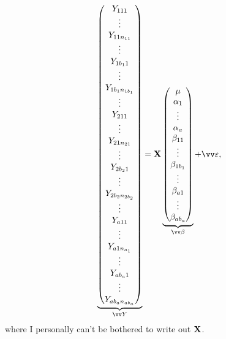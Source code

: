 \[ \underbrace{\begin{pmatrix}
            Y_{1 1 1}          \\
            \vdots             \\
            Y_{1 1 n_{11}}     \\
            \vdots             \\
            Y_{1 b_1 1}        \\
            \vdots             \\
            Y_{1 b_1 n_{1b_1}} \\
            \vdots             \\
            Y_{2 1 1}          \\
            \vdots             \\
            Y_{2 1 n_{21}}     \\
            \vdots             \\
            Y_{2 b_2 1}        \\
            \vdots             \\
            Y_{2 b_2 n_{2b_2}} \\
            \vdots             \\
            Y_{a 1 1}          \\
            \vdots             \\
            Y_{a 1 n_{a_1}}    \\
            \vdots             \\
            Y_{a b_a 1}        \\
            \vdots             \\
            Y_{a b_a n_{ab_a}}
        \end{pmatrix}}_{\Vector{Y}}=\Matrix{X}\underbrace{\begin{pmatrix}
            \mu          \\
            \alpha_1     \\
            \vdots       \\
            \alpha_a     \\
            \beta_{11}   \\
            \vdots       \\
            \beta_{1b_1} \\
            \vdots       \\
            \beta_{a1}   \\
            \vdots       \\
            \beta_{ab_a}
        \end{pmatrix}}_{\Vector{\beta}}+\Vector{\varepsilon}, \]
where I personally can't be bothered to write out $ \mathbf{X} $.

